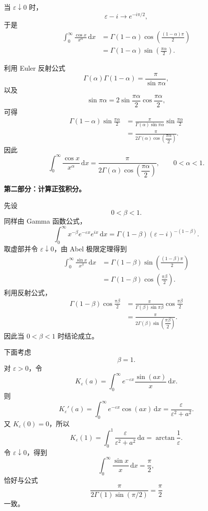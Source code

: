 \documentclass[12pt,a4paper]{ctexart}
\newcommand{\dd}{\,\mathrm d}
\begin{document}
当 \(\varepsilon\downarrow0\) 时，
\[
\varepsilon-i
\longrightarrow
e^{-i\pi/2},
\]
于是
\begin{align*}
\int_0^\infty
\frac{\cos x}{x^\alpha}\dd x
&=
\Gamma(1-\alpha)
\cos\left(
\frac{(1-\alpha)\pi}{2}
\right)\\
&=
\Gamma(1-\alpha)
\sin\left(
\frac{\pi\alpha}{2}
\right).
\end{align*}

利用 Euler 反射公式
\[
\Gamma(\alpha)\Gamma(1-\alpha)
=
\frac{\pi}{\sin\pi\alpha},
\]
以及
\[
\sin\pi\alpha
=
2\sin\frac{\pi\alpha}{2}
\cos\frac{\pi\alpha}{2},
\]
可得
\begin{align*}
\Gamma(1-\alpha)
\sin\frac{\pi\alpha}{2}
&=
\frac{\pi}
{\Gamma(\alpha)\sin\pi\alpha}
\sin\frac{\pi\alpha}{2}\\
&=
\frac{\pi}
{2\Gamma(\alpha)
\cos\left(\dfrac{\pi\alpha}{2}\right)}.
\end{align*}
因此
\[
\boxed{
\int_0^\infty\frac{\cos x}{x^\alpha}\dd x
=
\frac{\pi}
{2\Gamma(\alpha)
\cos\left(\dfrac{\pi\alpha}{2}\right)},
\qquad 0<\alpha<1.
}
\]

\medskip

\noindent
\textbf{第二部分：计算正弦积分。}

先设
\[
0<\beta<1.
\]
同样由 Gamma 函数公式，
\[
\int_0^\infty
x^{-\beta}
e^{-\varepsilon x}e^{ix}\dd x
=
\Gamma(1-\beta)
(\varepsilon-i)^{-(1-\beta)}.
\]
取虚部并令 \(\varepsilon\downarrow0\)，由 Abel 极限定理得到
\begin{align*}
\int_0^\infty
\frac{\sin x}{x^\beta}\dd x
&=
\Gamma(1-\beta)
\sin\left(
\frac{(1-\beta)\pi}{2}
\right)\\
&=
\Gamma(1-\beta)
\cos\left(
\frac{\pi\beta}{2}
\right).
\end{align*}
利用反射公式，
\begin{align*}
\Gamma(1-\beta)
\cos\frac{\pi\beta}{2}
&=
\frac{\pi}
{\Gamma(\beta)\sin\pi\beta}
\cos\frac{\pi\beta}{2}\\
&=
\frac{\pi}
{2\Gamma(\beta)
\sin\left(\dfrac{\pi\beta}{2}\right)}.
\end{align*}
因此当 \(0<\beta<1\) 时结论成立。

下面考虑
\[
\beta=1.
\]
对 \(\varepsilon>0\)，令
\[
K_\varepsilon(a)
=
\int_0^\infty
e^{-\varepsilon x}
\frac{\sin(ax)}x\dd x.
\]
则
\[
K_\varepsilon'(a)
=
\int_0^\infty
e^{-\varepsilon x}\cos(ax)\dd x
=
\frac{\varepsilon}{\varepsilon^2+a^2}.
\]
又 \(K_\varepsilon(0)=0\)，所以
\[
K_\varepsilon(1)
=
\int_0^1
\frac{\varepsilon}{\varepsilon^2+a^2}\dd a
=
\arctan\frac1\varepsilon.
\]
令 \(\varepsilon\downarrow0\)，得到
\[
\int_0^\infty\frac{\sin x}{x}\dd x
=
\frac{\pi}{2},
\]
恰好与公式
\[
\frac{\pi}
{2\Gamma(1)\sin(\pi/2)}
=
\frac{\pi}{2}
\]
一致。
\end{document}

